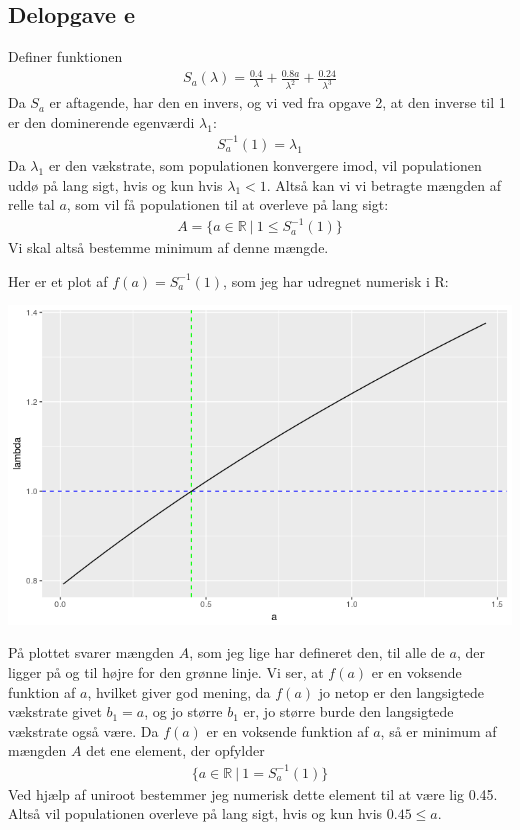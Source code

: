 \documentclass[12pt]{article}
\begin{document}
\subsection{Delopgave e}

Definer funktionen
\begin{align}
S_a(\lambda) = \frac{0.4}{\lambda} + \frac{0.8a}{\lambda^2} + \frac{0.24}{\lambda^3}
\end{align}
Da $S_a$ er aftagende, har den en invers, og vi ved fra opgave 2, at den inverse til 1 er den dominerende egenværdi $\lambda_1$:
\begin{align}
S_a^{-1}(1)=\lambda_1
\end{align}
Da $\lambda_1$ er den vækstrate, som populationen konvergere imod, vil populationen uddø på lang sigt, hvis og kun hvis $\lambda_1<1$. Altså kan vi vi betragte mængden af relle tal $a$, som vil få populationen til at overleve på lang sigt:
\begin{align}
A = \{a\in \mathbb{R}\ |\ 1 \leq S_a^{-1}(1) \}
\end{align}
Vi skal altså bestemme minimum af denne mængde. 

Her er et plot af $f(a) = S_a^{-1}(1)$, som jeg har udregnet numerisk i R:
\begin{center}
\includegraphics[scale=0.5]{q3p6.png}
\end{center}
På plottet svarer mængden $A$, som jeg lige har defineret den, til alle de $a$, der ligger på og til højre for den grønne linje. Vi ser, at $f(a)$ er en voksende funktion af $a$, hvilket giver god mening, da $f(a)$ jo netop er den langsigtede vækstrate givet $b_1=a$, og jo større $b_1$ er, jo større burde den langsigtede vækstrate også være. Da $f(a)$ er en voksende funktion af $a$, så er minimum af mængden $A$ det ene element, der opfylder
\begin{align}
\{a\in \mathbb{R}\ |\ 1 = S_a^{-1}(1) \}
\end{align}
Ved hjælp af uniroot bestemmer jeg numerisk dette element til at være lig 0.45. Altså vil populationen overleve på lang sigt, hvis og kun hvis $0.45\leq a$.
\end{document}
